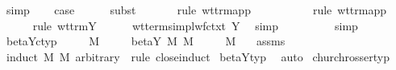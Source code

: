 \begin{isabellebody}
\ simp{\isacharplus}\isanewline
\ \ \isamarkupfalse%
\ {\isacharquery}case\isanewline
\ \ \ \ \isamarkupfalse%
\ {\isacharparenleft}subst\ {}{\isacharparenright}\isanewline
\ \ \ \ \isamarkupfalse%
\ {\isacharparenleft}rule\ wt{\isacharunderscore}trm{\isachardot}app{\isacharparenright}\isanewline
\ \ \ \ \isamarkupfalse%
\isanewline
\ \ \ \ \isamarkupfalse%
\ {\isacharparenleft}rule\ wt{\isacharunderscore}trm{\isachardot}app{\isacharparenright}\isanewline
\ \ \ \ \isamarkupfalse%
\ {\isacharparenleft}rule\ wt{\isacharunderscore}trm{\isachardot}Y{\isacharparenright}\isanewline
\ \ \ \ \isamarkupfalse%
\ wt{\isacharunderscore}terms{\isacharunderscore}impl{\isacharunderscore}wf{\isacharunderscore}ctxt\ Y\ \isamarkupfalse%
\ simp\isanewline
\ \ \ \ \isamarkupfalse%
\ {}{\isacharparenleft}{}{\isacharparenright}\ {}{\isacharparenleft}{}{\isacharparenright}\ \isamarkupfalse%
\ simp{\isacharplus}\isanewline
{}\isamarkupfalse%
%
\endisatagproof
{\isafoldproof}%
%
\isadelimproof
\isanewline
%
\endisadelimproof
\isanewline
{}\isamarkupfalse%
\ beta{\isacharunderscore}Y{\isacharunderscore}c{\isacharunderscore}typ{\isacharcolon}\isanewline
\ \ \ {\isachardoublequoteopen}{\isasymGamma}\ {\isasymturnstile}\ M\ {\isacharcolon}\ {\isasymsigma}{\isachardoublequoteclose}\isanewline
\ \ \ {\isachardoublequoteopen}beta{\isacharunderscore}Y{\isacharasterisk}\ M\ M{\isacharprime}{\isachardoublequoteclose}\isanewline
\ \ \ {\isachardoublequoteopen}{\isasymGamma}\ {\isasymturnstile}\ M{\isacharprime}\ {\isacharcolon}\ {\isasymsigma}{\isachardoublequoteclose}\isanewline
%
\isadelimproof
%
\endisadelimproof
%
\isatagproof
{}\isamarkupfalse%
\ assms{\isacharparenleft}{}{\isacharcomma}{}{\isacharparenright}\isanewline
{}\isamarkupfalse%
\ {\isacharparenleft}induct\ M\ M{\isacharprime}\ arbitrary{\isacharcolon}\ {\isasymsigma}\ rule{\isacharcolon}\ close{\isachardot}induct{\isacharparenright}\isanewline
{}\isamarkupfalse%
\ beta{\isacharunderscore}Y{\isacharunderscore}typ\ \isamarkupfalse%
\ auto%
\endisatagproof
{\isafoldproof}%
%
\isadelimproof
%
\endisadelimproof
%
\isamarkuptrue%
\isamarkupfalse%
\ church{\isacharunderscore}rosser{\isacharunderscore}typ{\isacharcolon}\isanewline

\end{isabellebody}
